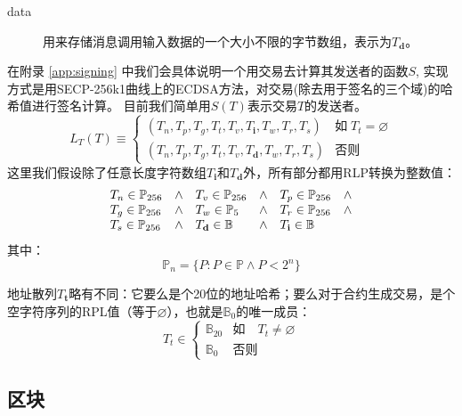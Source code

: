 \documentclass[UTF8,nofonts]{ctexart}
\begin{document}
\begin{multicols}{2}
\begin{description}
\item[data] 用来存储消息调用输入数据的一个大小不限的字节数组，表示为$T_\mathbf{d}$。
\end{description}
在附录 \ref{app:signing} 中我们会具体说明一个用交易去计算其发送者的函数$S$, 实现方式是用SECP-256k1曲线上的ECDSA方法，对交易(除去用于签名的三个域)的哈希值进行签名计算。 目前我们简单用$S(T)$表示交易$T$的发送者。
\begin{equation}
L_T(T) \equiv \begin{cases}
(T_n, T_p, T_g, T_t, T_v, T_\mathbf{i}, T_w, T_r, T_s) & \text{如} \; T_t = \varnothing\\
(T_n, T_p, T_g, T_t, T_v, T_\mathbf{d}, T_w, T_r, T_s) & \text{否则} 
\end{cases}
\end{equation}
这里我们假设除了任意长度字符数组$T_\mathbf{i}$和$T_\mathbf{d}$外，所有部分都用RLP转换为整数值：
\begin{equation}
\begin{array}[t]{lclclc}
T_n \in \mathbb{P}_{256} & \wedge & T_v \in \mathbb{P}_{256} & \wedge & T_p \in \mathbb{P}_{256} & \wedge \\
T_g \in \mathbb{P}_{256} & \wedge & T_w \in \mathbb{P}_5 & \wedge & T_r \in \mathbb{P}_{256} & \wedge \\
T_s \in \mathbb{P}_{256} & \wedge & T_\mathbf{d} \in \mathbb{B} & \wedge & T_\mathbf{i} \in \mathbb{B}
\end{array}
\end{equation}
其中：
\begin{equation}
\mathbb{P}_n = \{ P: P \in \mathbb{P} \wedge P < 2^n \}
\end{equation}

地址散列$T_\mathbf{t}$略有不同：它要么是个20位的地址哈希；要么对于合约生成交易，是个空字符序列的RPL值（等于$\varnothing$），也就是$\mathbb{B}_0$的唯一成员：
\begin{equation}
T_t \in \begin{cases} \mathbb{B}_{20} & \text{如} \quad T_t \neq \varnothing \\
\mathbb{B}_{0} & \text{否则}\end{cases}
\end{equation}

\subsection{区块} \label{ch:block}


\end{multicols}
\end{document}
